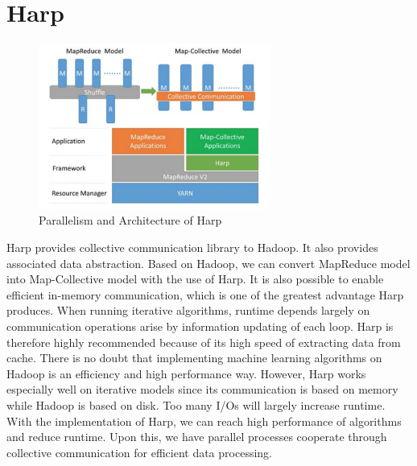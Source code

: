 \section{Harp}
\begin{figure}[htbp]
\centering
\includegraphics[width=3.0in]{image/Harp-structure.png}
\caption{Parallelism and Architecture of Harp}
\label{Harp}
\end{figure}

Harp provides collective communication library to Hadoop. It also provides associated data abstraction. Based on Hadoop, we can convert MapReduce model into Map-Collective model with the use of Harp. It is also possible to enable efficient in-memory communication, which is one of the greatest advantage Harp produces. When running iterative algorithms, runtime depends largely on communication operations arise  by information updating of each loop. Harp is therefore highly recommended because of its high speed of extracting data from cache. There is no doubt that implementing machine learning algorithms on Hadoop is an efficiency and high performance way. However, Harp works especially well on iterative models since its communication is based on memory while Hadoop is based on disk. Too many I/Os will largely increase runtime. With the implementation of Harp, we can reach high performance of algorithms and reduce runtime. Upon this, we have parallel processes cooperate through collective communication for efficient data processing. 

